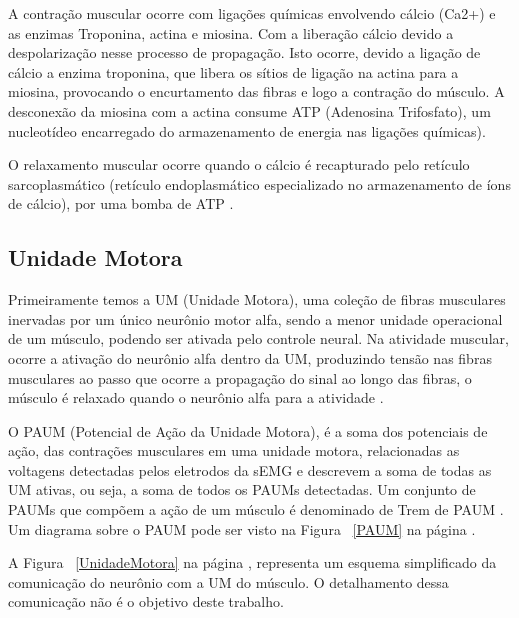 A contração muscular ocorre com ligações químicas envolvendo cálcio (Ca2+) e as enzimas Troponina, actina e miosina. Com a liberação cálcio devido a despolarização nesse processo de propagação. Isto ocorre, devido a ligação de cálcio a enzima troponina, que libera os sítios de ligação na actina para a miosina, provocando o encurtamento das fibras e logo a contração do músculo. A desconexão da miosina com a actina consume ATP (Adenosina Trifosfato), um nucleotídeo encarregado do armazenamento de energia nas ligações químicas)\cite{da2005detecccao}.

O relaxamento muscular ocorre quando o cálcio é recapturado pelo retículo sarcoplasmático (retículo endoplasmático especializado no armazenamento de íons de cálcio), por uma bomba de ATP \cite{da2005detecccao}. 

\subsection{Unidade Motora}
Primeiramente temos a UM (Unidade Motora), uma coleção de fibras musculares inervadas por um único neurônio motor alfa, sendo a menor unidade operacional de um músculo, podendo ser ativada pelo controle neural. Na atividade muscular, ocorre a ativação do neurônio alfa dentro da UM, produzindo tensão nas fibras musculares ao passo que ocorre a propagação do sinal ao longo das fibras, o músculo é relaxado quando o neurônio alfa para a atividade \cite{yousefi2014characterizing}.

O PAUM (Potencial de Ação da Unidade Motora), é a soma dos potenciais de ação, das contrações musculares em uma unidade motora, relacionadas as voltagens detectadas pelos eletrodos da sEMG e descrevem a soma de todas as UM ativas, ou seja, a soma de todos os PAUMs detectadas. Um conjunto de PAUMs que compõem a ação de um músculo é denominado de Trem de PAUM \cite{yousefi2014characterizing}. Um diagrama sobre o PAUM pode ser visto na Figura ~\ref{PAUM} na página \pageref{PAUM}.

A Figura ~\ref{UnidadeMotora} na página \pageref{UnidadeMotora}, representa um esquema simplificado da comunicação do neurônio com a UM do músculo. O detalhamento dessa comunicação não é o objetivo deste trabalho.

